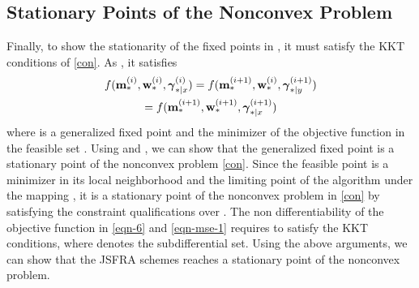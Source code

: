 
\subsection{Stationary Points of the Nonconvex Problem}

Finally, to show the stationarity of the fixed points in , it must satisfy the \ac{KKT} conditions of \eqref{con}. As , it satisfies
\begin{multline} \label{con-opt}\allowdisplaybreaks
f(\iter{\mx}{\ast}{i},\iter{\my}{\ast}{i},\iter{\mz}{\ast|x}{i}) = f(\iter{\mx}{\ast}{i+1},\iter{\my}{\ast}{i},\iter{\mz}{\ast|y}{i+1}) \\ = 
f(\iter{\mx}{\ast}{i+1},\iter{\my}{\ast}{i+1},\iter{\mz}{\ast|x}{i+1})
\end{multline}
where  is a generalized fixed point and the minimizer of the objective function  in the feasible set . Using \cite{marks1978technical} and \cite[Theorem 10]{lanckriet2009convergence}, we can show that the generalized fixed point is a stationary point of the nonconvex problem \eqref{con}. Since the feasible point  is a minimizer in its local neighborhood and the limiting point of the algorithm  under the mapping , it is a stationary point of the nonconvex problem in \eqref{con} by satisfying the constraint qualifications over . The non differentiability of the objective function in \eqref{eqn-6} and \eqref{eqn-mse-1} requires  to satisfy the \ac{KKT} conditions, where  denotes the subdifferential set. Using the above arguments, we can show that the \ac{JSFRA} schemes reaches a stationary point of the nonconvex problem. 
